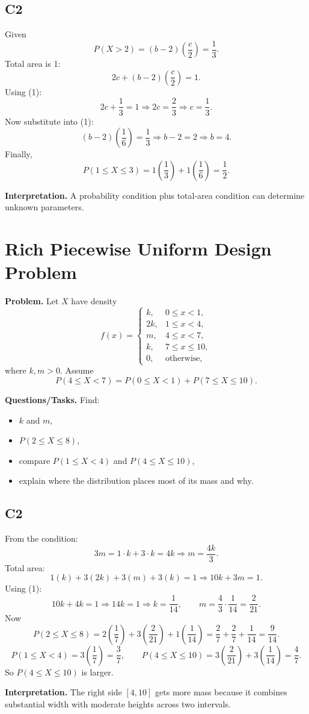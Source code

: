 \subsection*{C2}
Given
\[
P(X>2)=(b-2)\left(\frac{c}{2}\right)=\frac{1}{3}. \tag{1}
\]
Total area is 1:
\[
2c+(b-2)\left(\frac{c}{2}\right)=1.
\]
Using (1):
\[
2c+\frac{1}{3}=1 \Rightarrow 2c=\frac{2}{3} \Rightarrow c=\frac{1}{3}.
\]
Now substitute into (1):
\[
(b-2)\left(\frac{1}{6}\right)=\frac{1}{3}
\Rightarrow b-2=2
\Rightarrow b=4.
\]
Finally,
\[
P(1\le X\le 3)=1\left(\frac{1}{3}\right)+1\left(\frac{1}{6}\right)=\frac{1}{2}.
\]

\textbf{Interpretation.}
A probability condition plus total-area condition can determine unknown parameters.

\section{Rich Piecewise Uniform Design Problem}

\textbf{Problem.}
Let $X$ have density
\[
f(x)=
\begin{cases}
k, & 0\le x<1,\\
2k, & 1\le x<4,\\
m, & 4\le x<7,\\
k, & 7\le x\le 10,\\
0, & \text{otherwise,}
\end{cases}
\]
where $k,m>0$. Assume
\[
P(4\le X<7)=P(0\le X<1)+P(7\le X\le 10).
\]

\textbf{Questions/Tasks.}
Find:
\begin{itemize}
    \item[(a)] $k$ and $m$,
    \item[(b)] $P(2\le X\le 8)$,
    \item[(c)] compare $P(1\le X<4)$ and $P(4\le X\le 10)$,
    \item[(d)] explain where the distribution places most of its mass and why.
\end{itemize}

\subsection*{C2}
From the condition:
\[
3m=1\cdot k+3\cdot k=4k
\Rightarrow m=\frac{4k}{3}. \tag{1}
\]
Total area:
\[
1(k)+3(2k)+3(m)+3(k)=1
\Rightarrow 10k+3m=1.
\]
Using (1):
\[
10k+4k=1 \Rightarrow 14k=1 \Rightarrow k=\frac{1}{14},
\qquad
m=\frac{4}{3}\cdot\frac{1}{14}=\frac{2}{21}.
\]
Now
\[
P(2\le X\le 8)=2\left(\frac{1}{7}\right)+3\left(\frac{2}{21}\right)+1\left(\frac{1}{14}\right)
=\frac{2}{7}+\frac{2}{7}+\frac{1}{14}=\frac{9}{14}.
\]
\[
P(1\le X<4)=3\left(\frac{1}{7}\right)=\frac{3}{7},
\qquad
P(4\le X\le 10)=3\left(\frac{2}{21}\right)+3\left(\frac{1}{14}\right)=\frac{4}{7}.
\]
So $P(4\le X\le 10)$ is larger.

\textbf{Interpretation.}
The right side $[4,10]$ gets more mass because it combines substantial width with moderate heights across two intervals.


